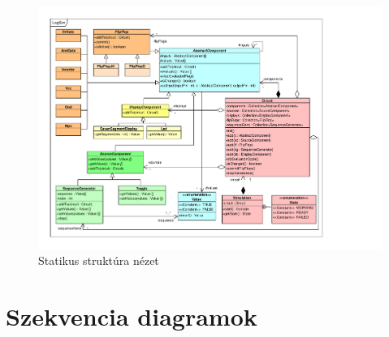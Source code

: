 \begin{figure}[H]
\begin{center}
\includegraphics*[angle=90, width=17cm, viewport = 25 30 695 565]{chapters/chapter04/classdiagram/class.pdf}
\caption{Statikus struktúra nézet}
\label{fig:class_diagram}
\end{center}
\end{figure}
%
%
%

\section{Szekvencia diagramok}


